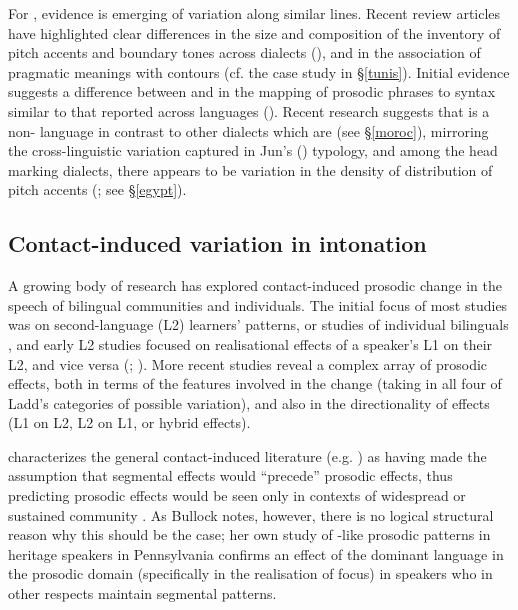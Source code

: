\documentclass[output=paper]{langsci/langscibook}
\begin{document}
For , evidence is emerging of variation along similar lines. Recent review articles have highlighted clear differences in the size and composition of the inventory of pitch accents and boundary tones across  dialects (\citealt{Chahal2011,ElZarka2017}), and in the association of pragmatic meanings with contours (cf. the case study in §\ref{tunis}). Initial evidence suggests a difference between  and   in the mapping of prosodic phrases to syntax \citep{Hellmuth2016} similar to that reported across  languages (\citealt{Dimperioetal2005}). Recent research suggests that   is a non- language in contrast to other  dialects which are  (see §\ref{moroc}), mirroring the cross-linguistic variation captured in Jun's (\citeyear{Jun2005}) typology, and among the head marking dialects, there appears to be variation in the density of distribution  of pitch accents (\citealt{ChahalHellmuth2015}; see §\ref{egypt}).


 
 \subsection{Contact-induced variation in intonation} \label{var}


A growing body of research has explored contact-induced prosodic change in the speech of bilingual communities and individuals. The initial focus of most studies was on second-language (L2) learners’  patterns, or studies of individual bilinguals \citep{Queen2012}, and early L2 studies focused on realisational effects of a speaker’s L1 on their L2, and vice versa (\citealt{AttererLadd2004}; \citealt{Mennen2004}). More recent studies reveal a complex array of prosodic effects, both in terms of the features involved in the change (taking in all four of Ladd’s categories of possible variation), and also in the directionality of effects (L1 on L2, L2 on L1, or hybrid effects). 

\citet{Bullock2009} characterizes the general contact-induced  literature (e.g. \citealt{WeinreichLabovHerzog1968,ThomasonKaufman1988}) as having made the assumption that segmental effects would ``precede'' prosodic effects, thus predicting prosodic effects would be seen only in contexts of widespread or sustained community . As Bullock notes, however, there is no logical structural reason why this should be the case; her own study of -like prosodic patterns in heritage  speakers in Pennsylvania confirms an effect of the dominant language in the prosodic domain (specifically in the realisation of focus) in speakers who in other respects maintain  segmental patterns.
\end{document}
